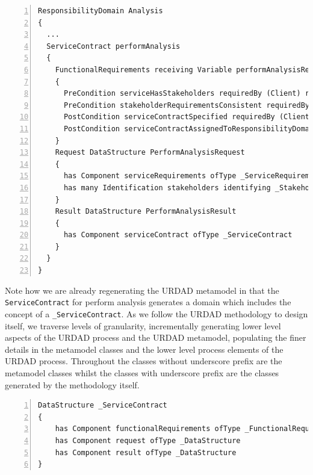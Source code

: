 \lstset{language=urdad,caption=Specifying a state constraint in the URDAD text grammar.,label=contractTextSyntax}
\begin{lstlisting}[numbers=left,escapechar=|]
ResponsibilityDomain Analysis
{
  ...
  ServiceContract performAnalysis 
  {
    FunctionalRequirements receiving Variable performAnalysisRequest ofType PerformAnalysisRequest yielding Variable performAnalsysiResult ofType PerformAnalysisResult
    {
      PreCondition serviceHasStakeholders requiredBy (Client) raises NoStakeholdersException checks Constraint ServiceHasStakeholders with Query OCL:"performAnalaysisRequest.serviceRequirements"
      PreCondition stakeholderRequirementsConsistent requiredBy (Client Development Architecture Testing) raises InconsistentStakeholderRequirementsException checks Constraint StakeholderRequirementsConsistent with Query OCL:"performAnalysisResult.serviceContract"
      PostCondition serviceContractSpecified requiredBy (Client Development Architecture Testing) ensures Constraint ServiceContractSpecified with Query OCL:"performAnalysisResult"
      PostCondition serviceContractAssignedToResponsibilityDomain requiredBy (Client) ensures Constraint ServiceContractAssignedToResponsibilityDomain with Query OCL:"performAnalysisResult.serviceContract"
    }
    Request DataStructure PerformAnalysisRequest
    {
      has Component serviceRequirements ofType _ServiceRequirements
      has many Identification stakeholders identifying _Stakeholder
    }
    Result DataStructure PerformAnalysisResult
    {
      has Component serviceContract ofType _ServiceContract
    }
  }
}
\end{lstlisting}

Note how we are already regenerating the URDAD metamodel in that the \verb+ServiceContract+ for perform analysis generates a domain which includes the concept of a \verb+_ServiceContract+. As we follow the URDAD methodology to design itself, we traverse levels of granularity, incrementally generating lower level aspects of the URDAD process and the URDAD metamodel, populating the finer details in the metamodel classes and the lower level process elements of the URDAD process. Throughout the classes without underscore prefix are the metamodel classes whilst the classes with underscore prefix are the classes generated by the methodology itself. 

\lstset{language=urdad,caption=Regenerated metamodel classes.,label=constraintTextSyntax}
\begin{lstlisting}[numbers=left,escapechar=|]
DataStructure _ServiceContract 
{
    has Component functionalRequirements ofType _FunctionalRequirements
    has Component request ofType _DataStructure
    has Component result ofType _DataStructure
}
\end{lstlisting}

